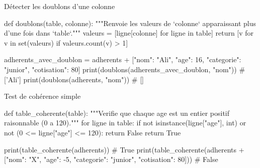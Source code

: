 
\begin{codereference}{Détecter les doublons d'une colonne}
\begin{python}
def doublons(table, colonne):
    """Renvoie les valeurs de `colonne` apparaissant plus d'une fois dans `table`."""
    valeurs = [ligne[colonne] for ligne in table]
    return [v for v in set(valeurs) if valeurs.count(v) > 1]

adherents_avec_doublon = adherents + [{"nom": "Ali", "age": 16, "categorie": "junior", "cotisation": 80}]
print(doublons(adherents_avec_doublon, "nom"))  # ['Ali']
print(doublons(adherents, "nom"))                # []
\end{python}
\end{codereference}



\begin{codereference}{Test de cohérence simple}
\begin{python}
def table_coherente(table):
    """Verifie que chaque age est un entier positif raisonnable (0 a 120)."""
    for ligne in table:
        if not isinstance(ligne["age"], int) or not (0 <= ligne["age"] <= 120):
            return False
    return True

print(table_coherente(adherents))                                    # True
print(table_coherente(adherents + [{"nom": "X", "age": -5,
                                     "categorie": "junior", "cotisation": 80}]))  # False
\end{python}
\end{codereference}

